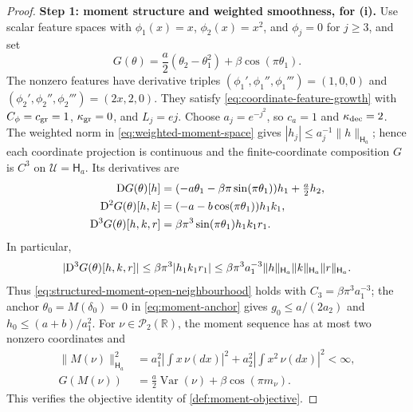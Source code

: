 \begin{proof}
\noindent\textbf{Step 1: moment structure and weighted smoothness, for (i).}
Use scalar feature spaces with $\phi_1(x)=x$, $\phi_2(x)=x^2$, and
$\phi_j=0$ for $j\ge3$, and set
\[
 G(\theta)=\frac a2(\theta_2-\theta_1^2)+\beta\cos(\pi\theta_1).
\]
The nonzero features have derivative triples
$(\phi_1',\phi_1'',\phi_1''')=(1,0,0)$ and
$(\phi_2',\phi_2'',\phi_2''')=(2x,2,0)$.
They satisfy \eqref{eq:coordinate-feature-growth} with
$C_\phi=c_{\rm gr}=1$, $\kappa_{\rm gr}=0$, and $L_j=ej$.
Choose $a_j=e^{-j^2}$, so $c_a=1$ and $\kappa_{\rm dec}=2$.
The weighted norm in \eqref{eq:weighted-moment-space} gives
$|h_j|\le a_j^{-1}\|h\|_{\mathsf H_a}$; hence each coordinate projection
is continuous and the finite-coordinate composition $G$ is $C^3$ on
$\mathcal U=\mathsf H_a$. Its derivatives are
\begin{equation}
 \begin{aligned}
 \mathrm{D} G(\theta)[h]
 &=(-a\theta_1-\beta\pi\sin(\pi\theta_1))h_1+\tfrac a2h_2,\\
 \mathrm{D}^2G(\theta)[h,k]&=(-a-b\cos(\pi\theta_1))h_1k_1,\\
 \mathrm{D}^3G(\theta)[h,k,r]&=\beta\pi^3\sin(\pi\theta_1)h_1k_1r_1.
 \end{aligned}
 \label{eq:canonical-moment-derivatives}
\end{equation}
In particular,
\[
 |\mathrm{D}^3G(\theta)[h,k,r]|
 \le\beta\pi^3|h_1k_1r_1|
 \le\beta\pi^3a_1^{-3}
       \|h\|_{\mathsf H_a}\|k\|_{\mathsf H_a}\|r\|_{\mathsf H_a}.
\]
Thus \eqref{eq:structured-moment-open-neighbourhood} holds with
$C_3=\beta\pi^3a_1^{-3}$; the anchor $\theta_0=M(\delta_0)=0$ in
\eqref{eq:moment-anchor} gives $g_0\le a/(2a_2)$ and
$h_0\le(a+b)/a_1^2$.
For $\nu\in\mathcal P_2(\mathbb R)$, the moment sequence has at most two
nonzero coordinates and
\[
 \begin{aligned}
 \|M(\nu)\|_{\mathsf H_a}^2
 &=a_1^2\left|\int x\,\nu(dx)\right|^2
       +a_2^2\left|\int x^2\,\nu(dx)\right|^2<\infty,\\
 G(M(\nu))&=\tfrac a2\operatorname{Var}(\nu)+\beta\cos(\pi m_\nu).
 \end{aligned}
\]
This verifies the objective identity of \cref{def:moment-objective}.


\end{proof}
